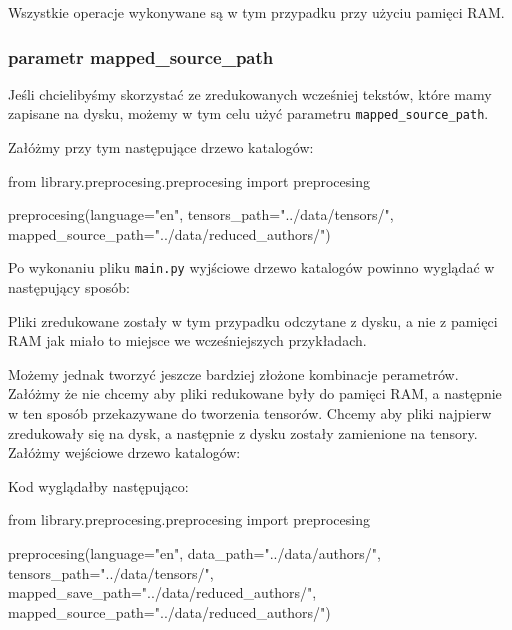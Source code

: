 Wszystkie operacje wykonywane są w tym przypadku przy użyciu pamięci RAM.

\newpage
\subsubsection{parametr mapped\_source\_path}
Jeśli chcielibyśmy skorzystać ze zredukowanych wcześniej tekstów, które mamy zapisane na dysku, 
możemy w tym celu użyć parametru \texttt{mapped\_source\_path}.

Załóżmy przy tym następujące drzewo katalogów:
\myspace
{}
\myspace

\begin{python}
from library.preprocesing.preprocesing import preprocesing

preprocesing(language="en",
              tensors_path="../data/tensors/",
              mapped_source_path="../data/reduced_authors/")
                   
\end{python}

Po wykonaniu pliku \texttt{main.py} wyjściowe drzewo katalogów powinno wyglądać w następujący sposób:
\myspace
{}
\myspace

Pliki zredukowane zostały w tym przypadku odczytane z dysku, a nie z pamięci RAM jak miało to miejsce
we wcześniejszych przykładach. 
\newline

Możemy jednak tworzyć jeszcze bardziej złożone kombinacje perametrów. Załóżmy że nie chcemy aby pliki redukowane były
do pamięci RAM, a następnie w ten sposób przekazywane do tworzenia tensorów. Chcemy aby pliki najpierw
zredukowały się na dysk, a następnie z dysku zostały zamienione na tensory. 
Załóżmy wejściowe drzewo katalogów:

\myspace
{}
\myspace

Kod wyglądałby następująco:
\begin{python}
from library.preprocesing.preprocesing import preprocesing

preprocesing(language="en",
              data_path="../data/authors/",
              tensors_path="../data/tensors/",
              mapped_save_path="../data/reduced_authors/",
              mapped_source_path="../data/reduced_authors/")

\end{python}

